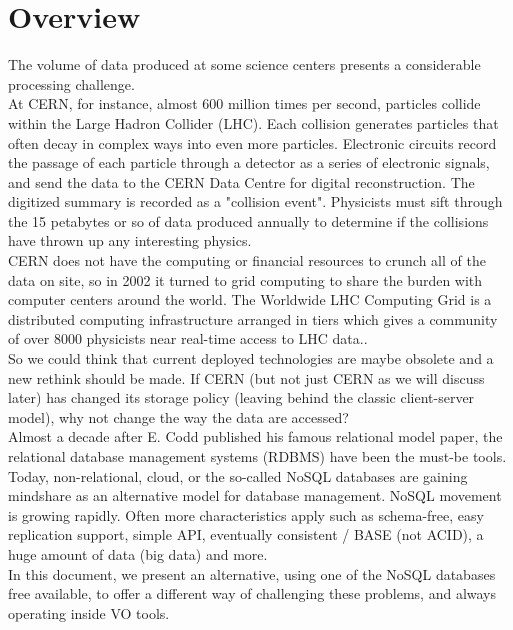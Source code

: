 
\chapter{Overview}


The volume of data produced at some science centers presents a considerable processing challenge.\\

At CERN, for instance, almost 600 million times per second, particles collide within the Large Hadron Collider (LHC). Each collision generates particles that often decay in complex ways into even more particles. Electronic circuits record the passage of each particle through a detector as a series of electronic signals, and send the data to the CERN Data Centre for digital reconstruction. The digitized summary is recorded as a "collision event". Physicists must sift through the 15 petabytes or so of data produced annually to determine if the collisions have thrown up any interesting physics. \\

CERN does not have the computing or financial resources to crunch all of the data on site, so in 2002 it turned to grid computing to share the burden with computer centers around the world. The Worldwide LHC Computing Grid is a distributed computing infrastructure arranged in tiers which gives a community of over 8000 physicists near real-time access to LHC data.. \\

So we could think that current deployed technologies are maybe obsolete and a new rethink should be made. If CERN (but not just CERN as we will discuss later) has changed its storage policy (leaving behind the classic client-server model), why not change the way the data are accessed? \\

Almost a decade after E. Codd published his famous relational model paper, the relational database management systems (RDBMS) have been the must-be tools. Today, non-relational, cloud, or the so-called NoSQL databases are gaining mindshare as an alternative model for database management. NoSQL movement is growing rapidly. Often more characteristics apply such as schema-free, easy replication support, simple API, eventually consistent / BASE (not ACID), a huge amount of data (big data) and more.\\

In this document, we present an alternative, using one of the NoSQL databases free available, to offer a different way of challenging these problems, and always operating inside VO tools.